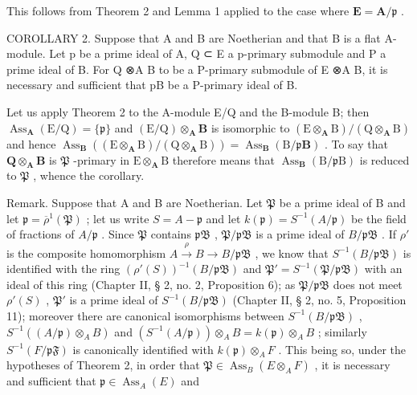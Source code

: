This follows from Theorem 2 and Lemma 1 applied to the case where \(\mathbf{E} = \mathbf{A} / \mathfrak{p}\) .

COROLLARY 2. Suppose that A and B are Noetherian and that B is a flat A-module. Let p be a prime ideal of A, Q ⊂ E a p-primary submodule and P a prime ideal of B. For Q ⊗A B to be a P-primary submodule of E ⊗A B, it is necessary and sufficient that pB be a P-primary ideal of B.

Let us apply Theorem 2 to the A-module E/Q and the B-module B; then \(\operatorname{Ass}_{\mathbf{A}}(\mathrm{E} / \mathrm{Q}) = \{\mathfrak{p}\}\) and \((\mathrm{E} / \mathrm{Q})\otimes_{\mathbf{A}}\mathbf{B}\) is isomorphic to \((\mathrm{E}\otimes_{\mathbf{A}}\mathrm{B}) / (\mathrm{Q}\otimes_{\mathbf{A}}\mathrm{B})\) and hence \(\operatorname{Ass}_{\mathbf{B}}((\mathrm{E}\otimes_{\mathbf{A}}\mathrm{B}) / (\mathrm{Q}\otimes_{\mathbf{A}}\mathrm{B})) = \operatorname{Ass}_{\mathbf{B}}(\mathrm{B} / \mathfrak{p}\mathbf{B})\) . To say that \(\mathbf{Q}\otimes_{\mathbf{A}}\mathbf{B}\) is \(\mathfrak{P}\) -primary in \(\mathrm{E}\otimes_{\mathbf{A}}\mathrm{B}\) therefore means that \(\operatorname{Ass}_{\mathbf{B}}(\mathrm{B} / \mathfrak{p}\mathrm{B})\) is reduced to \(\mathfrak{P}\) , whence the corollary.

Remark. Suppose that A and B are Noetherian. Let \(\mathfrak{P}\) be a prime ideal of B and let \(\mathfrak{p} = \overline{\rho}^{1}(\mathfrak{P})\) ; let us write \(S = A - \mathfrak{p}\) and let \(k(\mathfrak{p}) = S^{-1}(A / \mathfrak{p})\) be the field of fractions of \(A / \mathfrak{p}\) . Since \(\mathfrak{P}\) contains \(\mathfrak{pB}\) , \(\mathfrak{P} / \mathfrak{pB}\) is a prime ideal of \(B / \mathfrak{pB}\) . If \(\rho'\) is the composite homomorphism \(A \xrightarrow{\rho} B \to B / \mathfrak{pB}\) , we know that \(S^{-1}(B / \mathfrak{pB})\) is identified with the ring \((\rho'(S))^{-1}(B / \mathfrak{pB})\) and \(\mathfrak{P}' = S^{-1}(\mathfrak{P} / \mathfrak{pB})\) with an ideal of this ring (Chapter II, § 2, no. 2, Proposition 6); as \(\mathfrak{P} / \mathfrak{pB}\) does not meet \(\rho'(S)\) , \(\mathfrak{P}'\) is a prime ideal of \(S^{-1}(B / \mathfrak{pB})\) (Chapter II, § 2, no. 5, Proposition 11); moreover there are canonical isomorphisms between \(S^{-1}(B / \mathfrak{pB})\) , \(S^{-1}((A / \mathfrak{p}) \otimes_{A} B)\) and \((S^{-1}(A / \mathfrak{p})) \otimes_{A} B = k(\mathfrak{p}) \otimes_{A} B\) ; similarly \(S^{-1}(F / \mathfrak{pF})\) is canonically identified with \(k(\mathfrak{p}) \otimes_{A} F\) . This being so, under the hypotheses of Theorem 2, in order that \(\mathfrak{P} \in \operatorname{Ass}_{B}(E \otimes_{A} F)\) , it is necessary and sufficient that \(\mathfrak{p} \in \operatorname{Ass}_{A}(E)\) and

